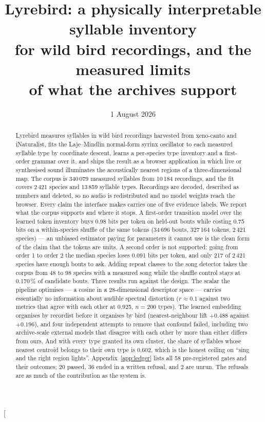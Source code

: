 \documentclass[10pt,twocolumn,a4paper]{article}
\title{\textbf{Lyrebird: a physically interpretable syllable inventory\\
for wild bird recordings, and the measured limits\\
of what the archives support}}
\author{\todo{author name, affiliation, ORCID}}
\date{1 August 2026}
\begin{document}
\makeatletter
\twocolumn[\begin{@twocolumnfalse}
\maketitle
\begin{abstract}
\noindent
Lyrebird measures syllables in wild bird recordings harvested from xeno-canto and
iNaturalist, fits the Laje--Mindlin normal-form syrinx oscillator to each measured
syllable type by coordinate descent, learns a per-species type inventory and a
first-order grammar over it, and ships the result as a browser application in which
live or synthesised sound illuminates the acoustically nearest regions of a
three-dimensional map. The corpus is 340\,079 measured syllables from 10\,184 recordings, and
the fit covers 2\,421 species and 13\,859 syllable types. Recordings are decoded, described as
numbers and deleted, so no audio is redistributed and no model weights reach the browser. Every
claim the interface makes carries one of five evidence labels.
%
We report what the corpus supports and where it stops. A first-order transition model
over the learned token inventory buys 0.98 bits per token on held-out bouts while
costing 0.75 bits on a within-species shuffle of the same tokens (34\,696 bouts,
327\,164 tokens, 2\,421 species) --- an unbiased estimator paying for parameters it
cannot use is the clean form of the claim that the tokens are units. A second order is
not supported: going from order 1 to order 2 the median species loses 0.091 bits per token, and
only 217 of 2\,421 species have enough bouts to ask. Adding repeat classes to the song detector takes the
corpus from 48 to 98 species with a measured song while the shuffle control stays at
0.170\,\% of candidate bouts.
%
Three results run against the design. The scalar the pipeline optimises --- a cosine in
a 28-dimensional descriptor space --- carries essentially no information about audible
spectral distortion ($r \approx 0.1$ against two metrics that agree with each other at
0.925, $n = 200$ types). The learned embedding organises by recordist before it
organises by bird (nearest-neighbour lift $+0.488$ against $+0.196$), and four
independent attempts to remove that confound failed, including two archive-scale
external models that disagree with each other by more than either differs from ours.
And with every type granted its own cluster, the share of syllables whose nearest
centroid belongs to their own type is 0.602, which is the honest ceiling on
``sing and the right region lights''.
%
Appendix~\ref{app:ledger} lists all 58 pre-registered gates and their outcomes; 20 passed,
36 ended in a written refusal, and 2 are unrun. The refusals are as much of the
contribution as the system is.
\end{abstract}


\end{@twocolumnfalse}
\end{document}
